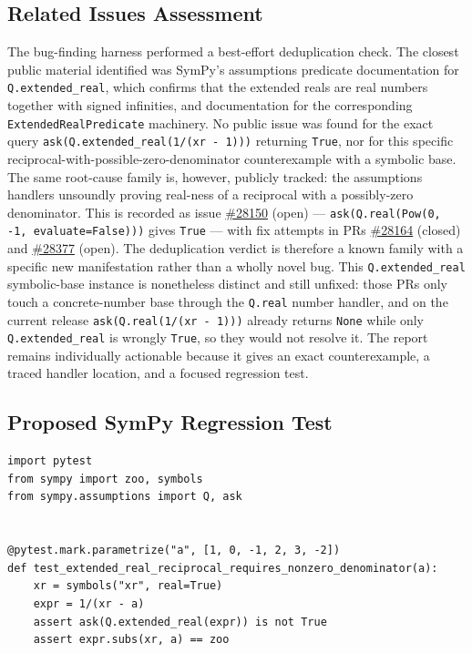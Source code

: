 \documentclass[11pt]{article}
\begin{document}
\subsection{Related Issues Assessment}

The bug-finding harness performed a best-effort deduplication check.  The closest
public material identified was SymPy's assumptions predicate documentation for
\texttt{Q.extended\_real}, which confirms that the extended reals are real
numbers together with signed infinities, and documentation for the corresponding
\texttt{ExtendedRealPredicate} machinery.  No public issue was found for the
exact query \texttt{ask(Q.extended\_real(1/(xr - 1)))} returning \texttt{True},
nor for this specific reciprocal-with-possible-zero-denominator counterexample
with a symbolic base.  The same root-cause family is, however, publicly tracked:
the assumptions handlers unsoundly proving real-ness of a reciprocal with a
possibly-zero denominator.  This is recorded as issue
\href{https://github.com/sympy/sympy/issues/28150}{\#28150} (open) ---
\texttt{ask(Q.real(Pow(0, -1, evaluate=False)))} gives \texttt{True} --- with
fix attempts in PRs
\href{https://github.com/sympy/sympy/pull/28164}{\#28164} (closed) and
\href{https://github.com/sympy/sympy/pull/28377}{\#28377} (open).  The
deduplication verdict is therefore a known family with a specific new
manifestation rather than a wholly novel bug.  This \texttt{Q.extended\_real}
symbolic-base instance is nonetheless distinct and still unfixed: those PRs only
touch a concrete-number base through the \texttt{Q.real} number handler, and on
the current release \texttt{ask(Q.real(1/(xr - 1)))} already returns
\texttt{None} while only \texttt{Q.extended\_real} is wrongly \texttt{True}, so
they would not resolve it.  The report remains individually actionable because it
gives an exact counterexample, a traced handler location, and a focused
regression test.

\subsection{Proposed SymPy Regression Test}

\medskip

\begin{lstlisting}[style=bugpython]
import pytest
from sympy import zoo, symbols
from sympy.assumptions import Q, ask


@pytest.mark.parametrize("a", [1, 0, -1, 2, 3, -2])
def test_extended_real_reciprocal_requires_nonzero_denominator(a):
    xr = symbols("xr", real=True)
    expr = 1/(xr - a)
    assert ask(Q.extended_real(expr)) is not True
    assert expr.subs(xr, a) == zoo
\end{lstlisting}
\end{document}
